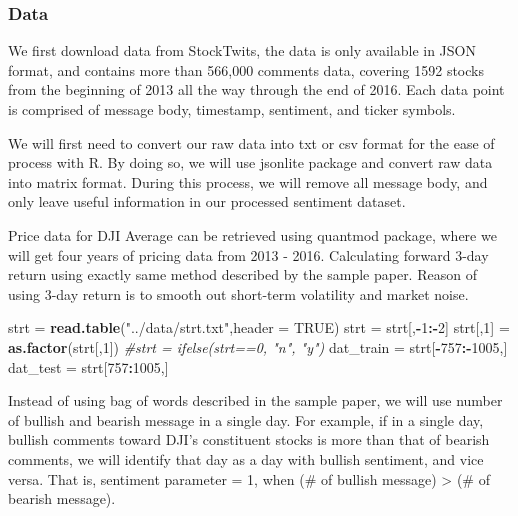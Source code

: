 \documentclass[]{article}
\newenvironment{Shaded}{\begin{snugshade}}{\end{snugshade}}
\newcommand{\KeywordTok}[1]{\textcolor[rgb]{0.13,0.29,0.53}{\textbf{#1}}}
\newcommand{\DataTypeTok}[1]{\textcolor[rgb]{0.13,0.29,0.53}{#1}}
\newcommand{\DecValTok}[1]{\textcolor[rgb]{0.00,0.00,0.81}{#1}}
\newcommand{\StringTok}[1]{\textcolor[rgb]{0.31,0.60,0.02}{#1}}
\newcommand{\CommentTok}[1]{\textcolor[rgb]{0.56,0.35,0.01}{\textit{#1}}}
\newcommand{\OtherTok}[1]{\textcolor[rgb]{0.56,0.35,0.01}{#1}}
\newcommand{\OperatorTok}[1]{\textcolor[rgb]{0.81,0.36,0.00}{\textbf{#1}}}
\newcommand{\NormalTok}[1]{#1}
\begin{document}
\subsubsection{Data}\label{data}

We first download data from StockTwits, the data is only available in
JSON format, and contains more than 566,000 comments data, covering 1592
stocks from the beginning of 2013 all the way through the end of 2016.
Each data point is comprised of message body, timestamp, sentiment, and
ticker symbols.

We will first need to convert our raw data into txt or csv format for
the ease of process with R. By doing so, we will use jsonlite package
and convert raw data into matrix format. During this process, we will
remove all message body, and only leave useful information in our
processed sentiment dataset.

Price data for DJI Average can be retrieved using quantmod package,
where we will get four years of pricing data from 2013 - 2016.
Calculating forward 3-day return using exactly same method described by
the sample paper. Reason of using 3-day return is to smooth out
short-term volatility and market noise.

\begin{Shaded}
\begin{Highlighting}[]
\NormalTok{strt =}\StringTok{ }\KeywordTok{read.table}\NormalTok{(}\StringTok{"../data/strt.txt"}\NormalTok{,}\DataTypeTok{header =} \OtherTok{TRUE}\NormalTok{)}
\NormalTok{strt =}\StringTok{ }\NormalTok{strt[,}\OperatorTok{-}\DecValTok{1}\OperatorTok{:-}\DecValTok{2}\NormalTok{]}
\NormalTok{strt[,}\DecValTok{1}\NormalTok{] =}\StringTok{ }\KeywordTok{as.factor}\NormalTok{(strt[,}\DecValTok{1}\NormalTok{])}
\CommentTok{#strt = ifelse(strt==0, "n", "y") }
\NormalTok{dat_train =}\StringTok{ }\NormalTok{strt[}\OperatorTok{-}\DecValTok{757}\OperatorTok{:-}\DecValTok{1005}\NormalTok{,]}
\NormalTok{dat_test =}\StringTok{ }\NormalTok{strt[}\DecValTok{757}\OperatorTok{:}\DecValTok{1005}\NormalTok{,]}
\end{Highlighting}
\end{Shaded}

Instead of using bag of words described in the sample paper, we will use
number of bullish and bearish message in a single day. For example, if
in a single day, bullish comments toward DJI's constituent stocks is
more than that of bearish comments, we will identify that day as a day
with bullish sentiment, and vice versa. That is, sentiment parameter =
1, when (\# of bullish message) \textgreater{} (\# of bearish message).
\end{document}
